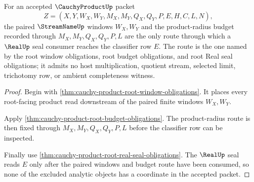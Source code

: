 \begin{theorem}
\label{thm:cauchy-product-root-window-seal-compatibility}
For an accepted $\CauchyProductUp$ packet
$$
Z=(X,Y,W_X,W_Y,M_X,M_Y,Q_X,Q_Y,P,E,H,C,L,N),
$$
the paired $\StreamNameUp$ windows $W_X,W_Y$ and the product-radius budget recorded through $M_X,M_Y,Q_X,Q_Y,P,L$ are the only route through which a $\RealUp$ seal consumer reaches the classifier row $E$. The route is the one named by the root window obligations, root budget obligations, and root Real seal obligations; it admits no host multiplication, quotient stream, selected limit, trichotomy row, or ambient completeness witness.
\end{theorem}
\begin{proof}
Begin with \autoref{thm:cauchy-product-root-window-obligations}. It places every root-facing product read downstream of the paired finite windows $W_X,W_Y$.

Apply \autoref{thm:cauchy-product-root-budget-obligations}. The product-radius route is then fixed through $M_X,M_Y,Q_X,Q_Y,P,L$ before the classifier row can be inspected.

Finally use \autoref{thm:cauchy-product-root-real-seal-obligations}. The $\RealUp$ seal reads $E$ only after the paired windows and budget route have been consumed, so none of the excluded analytic objects has a coordinate in the accepted packet.
\end{proof}

